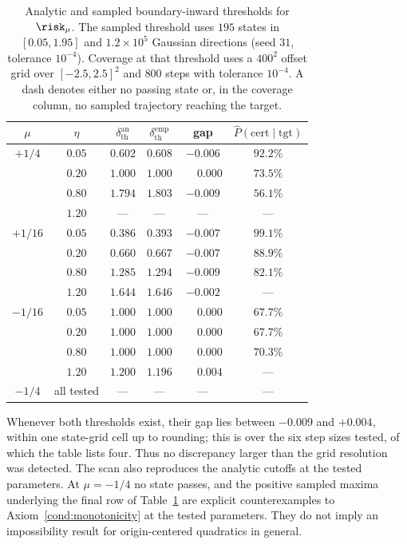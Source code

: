 \documentclass{article}
\begin{document}
\begin{table}[t]
    \centering
    \caption{Analytic and sampled boundary-inward thresholds for $\risk_\mu$.
    The sampled threshold uses $195$ states in $[0.05,1.95]$ and
    $1.2\times10^5$ Gaussian directions (seed $31$, tolerance $10^{-4}$).
    Coverage at that threshold uses a $400^2$ offset grid over
    $[-2.5,2.5]^2$ and $800$ steps with tolerance $10^{-4}$. A dash denotes
    either no passing state or, in the coverage column, no sampled trajectory
    reaching the target.}
    \label{tab:quartic_thresholds}
    \begin{tabular}{cccccc}
        \toprule
        $\mu$ & $\eta$
        & $\delta_{\mathrm{th}}^{\mathrm{an}}$
        & $\delta_{\mathrm{th}}^{\mathrm{emp}}$
        & gap
        & $\widehat P(\text{cert}\mid\text{tgt})$ \\
        \midrule
        $+1/4$ & $0.05$ & $0.602$ & $0.608$ & $-0.006$ & $92.2\%$ \\
               & $0.20$ & $1.000$ & $1.000$ & $\phantom{-}0.000$ & $73.5\%$ \\
               & $0.80$ & $1.794$ & $1.803$ & $-0.009$ & $56.1\%$ \\
               & $1.20$ & --- & --- & --- & --- \\
        \midrule
        $+1/16$ & $0.05$ & $0.386$ & $0.393$ & $-0.007$ & $99.1\%$ \\
                & $0.20$ & $0.660$ & $0.667$ & $-0.007$ & $88.9\%$ \\
                & $0.80$ & $1.285$ & $1.294$ & $-0.009$ & $82.1\%$ \\
                & $1.20$ & $1.644$ & $1.646$ & $-0.002$ & --- \\
        \midrule
        $-1/16$ & $0.05$ & $1.000$ & $1.000$ & $\phantom{-}0.000$ & $67.7\%$ \\
                & $0.20$ & $1.000$ & $1.000$ & $\phantom{-}0.000$ & $67.7\%$ \\
                & $0.80$ & $1.000$ & $1.000$ & $\phantom{-}0.000$ & $70.3\%$ \\
                & $1.20$ & $1.200$ & $1.196$ & $\phantom{-}0.004$ & --- \\
        \midrule
        $-1/4$ & all tested & --- & --- & --- & --- \\
        \bottomrule
    \end{tabular}
\end{table}

Whenever both thresholds exist, their gap lies between $-0.009$ and $+0.004$,
within one state-grid cell up to rounding; this is over the six step sizes
tested, of which the table lists four. Thus no discrepancy larger than the
grid resolution was detected. The scan also
reproduces the analytic cutoffs at the tested parameters. At $\mu=-1/4$ no
state passes, and the positive sampled maxima underlying the final row of
Table~\ref{tab:quartic_thresholds} are explicit counterexamples to
Axiom~\ref{cond:monotonicity} at the tested parameters. They do not imply an
impossibility result for origin-centered quadratics in general.
\end{document}
